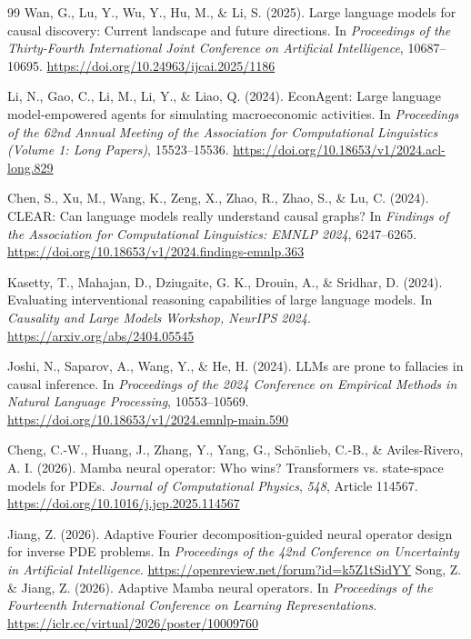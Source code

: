 \begin{thebibliography}{99}
 Wan, G., Lu, Y., Wu, Y., Hu, M., \& Li, S. (2025). Large language models for causal discovery: Current landscape and future directions. In \textit{Proceedings of the Thirty-Fourth International Joint Conference on Artificial Intelligence}, 10687--10695. \url{https://doi.org/10.24963/ijcai.2025/1186}

 Li, N., Gao, C., Li, M., Li, Y., \& Liao, Q. (2024). EconAgent: Large language model-empowered agents for simulating macroeconomic activities. In \textit{Proceedings of the 62nd Annual Meeting of the Association for Computational Linguistics (Volume 1: Long Papers)}, 15523--15536. \url{https://doi.org/10.18653/v1/2024.acl-long.829}

 Chen, S., Xu, M., Wang, K., Zeng, X., Zhao, R., Zhao, S., \& Lu, C. (2024). CLEAR: Can language models really understand causal graphs? In \textit{Findings of the Association for Computational Linguistics: EMNLP 2024}, 6247--6265. \url{https://doi.org/10.18653/v1/2024.findings-emnlp.363}

 Kasetty, T., Mahajan, D., Dziugaite, G. K., Drouin, A., \& Sridhar, D. (2024). Evaluating interventional reasoning capabilities of large language models. In \textit{Causality and Large Models Workshop, NeurIPS 2024}. \url{https://arxiv.org/abs/2404.05545}

 Joshi, N., Saparov, A., Wang, Y., \& He, H. (2024). LLMs are prone to fallacies in causal inference. In \textit{Proceedings of the 2024 Conference on Empirical Methods in Natural Language Processing}, 10553--10569. \url{https://doi.org/10.18653/v1/2024.emnlp-main.590}

 Cheng, C.-W., Huang, J., Zhang, Y., Yang, G., Sch{\"o}nlieb, C.-B., \& Aviles-Rivero, A. I. (2026). Mamba neural operator: Who wins? Transformers vs. state-space models for PDEs. \textit{Journal of Computational Physics}, \textit{548}, Article 114567. \url{https://doi.org/10.1016/j.jcp.2025.114567}

 Jiang, Z. (2026). Adaptive Fourier decomposition-guided neural operator design for inverse PDE problems. In \textit{Proceedings of the 42nd Conference on Uncertainty in Artificial Intelligence}. \url{https://openreview.net/forum?id=k5Z1tSidYY}
 Song, Z. \& Jiang, Z. (2026). Adaptive Mamba neural operators. In \textit{Proceedings of the Fourteenth International Conference on Learning Representations}. \url{https://iclr.cc/virtual/2026/poster/10009760}


\end{thebibliography}
